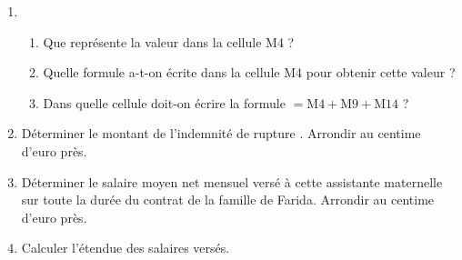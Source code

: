 \smallskip

\begin{enumerate}
\item 
	\begin{enumerate}
		\item Que représente la valeur  dans la cellule M4 ?
		\item Quelle formule a-t-on écrite dans la cellule M4 pour obtenir cette valeur ?
		\item Dans quelle cellule doit-on écrire la formule $= \text{M}4 + \text{M}9 + \text{M}14$ ?
	\end{enumerate}
\item Déterminer le montant de \og l'indemnité de rupture \fg. Arrondir au centime d'euro près.
\item Déterminer le salaire moyen net mensuel versé à cette assistante maternelle sur toute
la durée du contrat de la famille de Farida. Arrondir au centime d'euro près.
\item Calculer l'étendue des salaires versés.
\end{enumerate}

\bigskip

